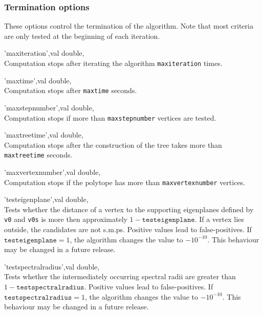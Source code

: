 \subsubsection{Termination options} These options control the termination of the algorithm.
Note that most criteria are only tested at the beginning of each iteration.
\begin{param}
\item['maxiteration',val] double, \\Computation stops after iterating the algorithm \texttt{maxiteration} times. 

\item['maxtime',val] double, \\Computation stops after \texttt{maxtime} seconds. 

\item['maxstepnumber',val] double, \\Computation stops if more than \texttt{maxstepnumber} vertices are tested. 

\item['maxtreetime',val] double, \\Computation stops after the construction of the tree takes more than \texttt{maxtreetime} seconds. 


\item['maxvertexnumber',val] double, \\Computation stops if the polytope has more than \texttt{maxvertexnumber} vertices. 

\item['testeigenplane',val] double, \\
Tests whether the distance of a vertex to the supporting eigenplanes defined by \texttt{v0} and \texttt{v0s} is more then approximately $1-\texttt{testeigenplane}$. If a vertex lies outside, the candidates are not s.m.ps. 
Positive values lead to false-positives. 
If $\texttt{testeigenplane}=1$, the algorithm changes the value to $-10^{-10}$.
{\color{red} This behaviour may be changed in a future release.}

\item['testspectralradius',val] double, \\
Tests whether the intermediately occurring spectral radii are greater than $1-\texttt{testspectralradius}$. Positive values lead to false-positives. 
If $\texttt{testspectralradius}=1$, the algorithm changes the value to $-10^{-10}$.
{\color{red} This behaviour may be changed in a future release.}


\end{param}
